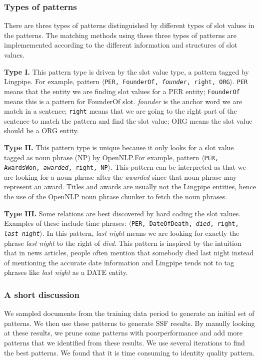 \subsubsection{Types of patterns}
There are three types of patterns distinguished by different types of slot values in the patterns. 
The matching methods using these three types of patterns are implememented according to the different information and structures of slot values.

 
\textbf{Type I.} This pattern type is driven by the slot value type, a pattern
tagged by Lingpipe. For example, pattern
$\langle$\texttt{PER, FounderOf, \textit{founder}, right, ORG}$\rangle$. \texttt{PER} means 
that the entity we are finding slot values for a PER entity; \texttt{FounderOf} 
means this is a pattern for FounderOf slot. \textit{founder} is the anchor word we are 
match in a sentence; \texttt{right} means that we are going to the 
right part of the sentence to match the pattern and find the slot value; ORG 
means the slot value should be a ORG entity.

\textbf{Type II.} This pattern type is unique because it only looks for a
slot value tagged as noun phrase (NP) by OpenNLP.\@ For example,
pattern $\langle$\texttt{PER, AwardsWon, \textit{awarded}, 
right, NP}$\rangle$. This pattern can be interpreted 
as that we are looking for a noun phrase after the \textit{awarded} since that noun 
phrase may represent an award. Titles and awards are usually 
not the Lingpipe entities, hence the use of the OpenNLP noun phrase chunker to fetch the 
noun phrases.

\textbf{Type III.} Some relations are best discovered by hard coding the slot values.
Examples of these include time phrases: $\langle$\texttt{PER, DateOfDeath, \textit{died}, right, 
\textit{last night}}$\rangle$. In this pattern, \textit{last night} means we are looking for 
exactly the phrase \textit{last night} to the right of \textit{died}. This pattern is 
inspired by the intuition that in news articles, people often mention that 
somebody died last night instead of mentioning the accurate date information 
and Lingpipe tends not to tag phrases like \textit{last night} as a DATE entity. 


\subsubsection{A short discussion}
We sampled documents from the training data period to generate an initial set of patterns. We then use these patterns to generate SSF results. By manully looking at these results, we prune some patterns with poor­performance and add more patterns that we identified from these results. We use several iterations to find the best patterns. We found that it is time consuming to identity quality pattern.


